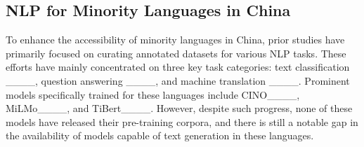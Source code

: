 
\subsection{NLP for Minority Languages in China}
To enhance the accessibility of minority languages in China, prior studies have primarily focused on curating annotated datasets for various NLP tasks. These efforts have mainly concentrated on three key task categories: text classification ____, question answering ____, and machine translation ____. Prominent models specifically trained for these languages include CINO____, MiLMo____, and TiBert____. However, despite such progress, none of these models have released their pre-training corpora, and there is still a notable gap in the availability of models capable of text generation in these languages.


    
